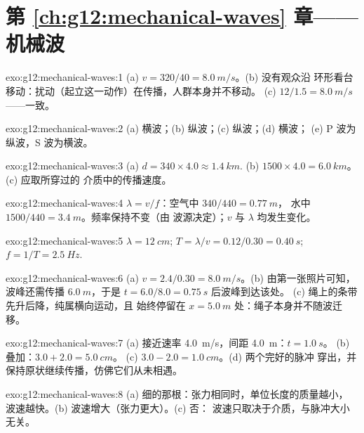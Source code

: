 \section*{第 \ref{ch:g12:mechanical-waves} 章——机械波}

\begin{solution}{exo:g12:mechanical-waves:1}
(a) $v = 320/40 = \qty{8.0}{m/s}$。(b) 没有观众沿
环形看台移动：扰动（起立这一动作）在传播，人群本身并不移动。
(c) $12/1.5 = \qty{8.0}{m/s}$——一致。
\end{solution}

\begin{solution}{exo:g12:mechanical-waves:2}
(a) 横波；(b) 纵波；(c) 纵波；(d) 横波；
(e) P 波为纵波，S 波为横波。
\end{solution}

\begin{solution}{exo:g12:mechanical-waves:3}
(a) $d = 340 \times 4.0 \approx \qty{1.4}{km}$.
(b) $1500 \times 4.0 = \qty{6.0}{km}$。(c) 应取所穿过的
介质中的传播速度。
\end{solution}

\begin{solution}{exo:g12:mechanical-waves:4}
$\lambda = v/f$：空气中 $340/440 = \qty{0.77}{m}$，
水中 $1500/440 = \qty{3.4}{m}$。频率保持不变（由
波源决定）；$v$ 与 $\lambda$ 均发生变化。
\end{solution}

\begin{solution}{exo:g12:mechanical-waves:5}
$\lambda = \qty{12}{cm}$; $T = \lambda/v = 0.12/0.30 = \qty{0.40}{s}$;
$f = 1/T = \qty{2.5}{Hz}$.
\end{solution}

\begin{solution}{exo:g12:mechanical-waves:6}
(a) $v = 2.4/0.30 = \qty{8.0}{m/s}$。(b) 由第一张照片可知，
波峰还需传播 $\qty{6.0}{m}$，于是 $t = 6.0/8.0 = \qty{0.75}{s}$ 后波峰到达该处。
(c) 绳上的条带先升后降，纯属横向运动，且
始终停留在 $x = \qty{5.0}{m}$ 处：绳子本身并不随波迁移。
\end{solution}

\begin{solution}{exo:g12:mechanical-waves:7}
(a) 接近速率 \qty{4.0}{m/s}，间距 \qty{4.0}{m}：$t = \qty{1.0}{s}$。
(b) 叠加：$3.0 + 2.0 = \qty{5.0}{cm}$。
(c) $3.0 - 2.0 = \qty{1.0}{cm}$。(d) 两个完好的脉冲
穿出，并保持原状继续传播，仿佛它们从未相遇。
\end{solution}

\begin{solution}{exo:g12:mechanical-waves:8}
(a) 细的那根：张力相同时，单位长度的质量越小，
波速越快。(b) 波速增大（张力更大）。(c) 否：
波速只取决于介质，与脉冲大小无关。
\end{solution}

